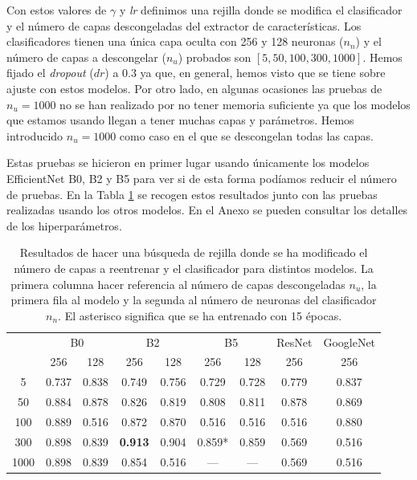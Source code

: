\documentclass[a4paper,12pt,twoside,titlepage]{article}
\begin{document}
Con estos valores de $\gamma$ y \textit{lr} definimos una rejilla donde se modifica el clasificador y el número de capas descongeladas del extractor de características. Los clasificadores tienen una única capa oculta con 256 y 128 neuronas ($n_n$) y el número de capas a descongelar ($n_u$) probados son $\left[5, 50, 100, 300, 1000 \right]$. Hemos fijado el \textit{dropout} ($dr$) a 0.3 ya que, en general, hemos visto que se tiene sobre ajuste con estos modelos. Por otro lado, en algunas ocasiones las pruebas de $n_u = 1000$ no se han realizado por no tener memoria suficiente ya que los modelos que estamos usando llegan a tener muchas capas y parámetros. Hemos introducido $n_u=1000$ como caso en el que se descongelan todas las capas.  

Estas pruebas se hicieron en primer lugar usando únicamente los modelos EfficientNet B0, B2 y B5 para ver si de esta forma podíamos reducir el número de pruebas. En la Tabla \ref{tab:res_ajuste_pre} se recogen estos resultados junto con las pruebas realizadas usando los otros modelos. En el Anexo se pueden consultar los detalles de los hiperparámetros.


\begin{table}[h!]
  \centering
  \begin{tabular}{|c||cc|cc|cc|c|c|}
  \hline
  \multirow{2}{*}{} & \multicolumn{2}{c|}{B0}            & \multicolumn{2}{c|}{B2}            & \multicolumn{2}{c|}{B5}             & ResNet & GoogleNet \\ \cline{2-9} 
                    & \multicolumn{1}{c|}{256}   & 128   & \multicolumn{1}{c|}{256}   & 128   & \multicolumn{1}{c|}{256}    & 128   & 256    & 256       \\ \hline\hline
  5                 & \multicolumn{1}{c|}{0.737} & 0.838 & \multicolumn{1}{c|}{0.749} & 0.756 & \multicolumn{1}{c|}{0.729}  & 0.728 & 0.779  & 0.837     \\ \hline
  50                & \multicolumn{1}{c|}{0.884} & 0.878 & \multicolumn{1}{c|}{0.826} & 0.819 & \multicolumn{1}{c|}{0.808}  & 0.811 & 0.878  & 0.869     \\ \hline
  100               & \multicolumn{1}{c|}{0.889} & 0.516 & \multicolumn{1}{c|}{0.872} & 0.870 & \multicolumn{1}{c|}{0.516}  & 0.516 & 0.516  & 0.880     \\ \hline
  300               & \multicolumn{1}{c|}{0.898} & 0.839 & \multicolumn{1}{c|}{\textbf{0.913}} & 0.904 & \multicolumn{1}{c|}{0.859*} & 0.859 & 0.569  & 0.516     \\ \hline
  1000              & \multicolumn{1}{c|}{0.898} & 0.839 & \multicolumn{1}{c|}{0.854} & 0.516 & \multicolumn{1}{c|}{---}    & ---   & 0.569  & 0.516     \\ \hline
  \end{tabular}
  \caption{Resultados de hacer una búsqueda de rejilla donde se ha modificado el número de capas a reentrenar y el clasificador para distintos modelos. La primera columna hacer referencia al número de capas descongeladas $n_u$, la primera fila al modelo y la segunda al número de neuronas del clasificador $n_n$. El asterisco significa que se ha entrenado con 15 épocas.}
  \label{tab:res_ajuste_pre}
\end{table}
\end{document}
